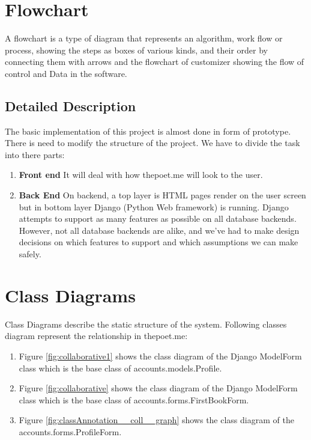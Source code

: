 \section{Flowchart}
A flowchart is a type of diagram that represents an algorithm, work flow or process, showing the steps as boxes of various kinds, and their order by connecting them with arrows and the flowchart of customizer showing the flow of control and Data in the software.

\subsection{Detailed Description}

The basic implementation of this project is almost done in form of prototype. There is need to modify the structure of the project. We have to divide the task into there parts:

\begin{enumerate}
	\item \textbf{Front end}
	It will deal with how thepoet.me will look to the user.
	
	\item \textbf{Back End}
	On backend, a top layer is HTML pages render on the user screen but in bottom layer Django (Python Web framework) is running. Django attempts to support as many features as possible on all database backends. However, not all database backends are alike, and we’ve had to make design decisions on which features to support and which assumptions we can make safely.  
	
\end{enumerate}


\section{Class Diagrams}
Class Diagrams describe the static structure of the system. Following classes diagram represent the relationship in thepoet.me:
\begin{enumerate}
	\item Figure \ref{fig:collaborative1} shows the class diagram of the Django ModelForm class which is the base class of accounts.models.Profile.

	\item Figure \ref{fig:collaborative} shows the class diagram of the Django ModelForm class which is the base class of accounts.forms.FirstBookForm.
	
	\item Figure \ref{fig:classAnnotation__coll__graph} shows the class diagram of the accounts.forms.ProfileForm.

\end{enumerate}


